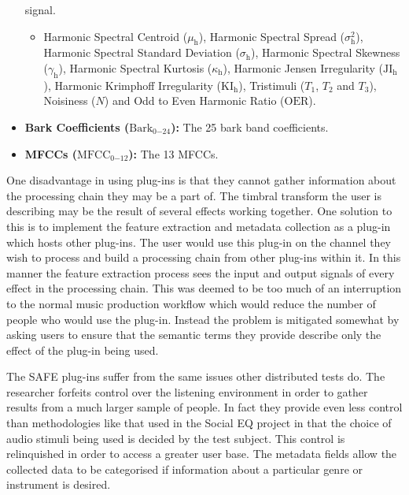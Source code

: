 \begin{itemize}
			      signal.
			\begin{itemize}
				\item Harmonic Spectral Centroid ($\mu_{\mathrm{h}}$), Harmonic Spectral Spread
				      ($\sigma_{\mathrm{h}}^{2}$), Harmonic Spectral Standard Deviation
				      ($\sigma_{\mathrm{h}}$), Harmonic Spectral Skewness ($\gamma_{\mathrm{h}}$), Harmonic
				      Spectral Kurtosis ($\kappa_{\mathrm{h}}$), Harmonic Jensen Irregularity
				      ($\mathrm{JI_{h}}$), Harmonic Krimphoff Irregularity
				      ($\mathrm{KI_{h}}$), Tristimuli ($T_{1}$, $T_{2}$ and $T_{3}$), Noisiness
				      ($N$) and Odd to Even Harmonic Ratio ($\mathrm{OER}$).
			\end{itemize}
			\item {\bf{Bark Coefficients (}}$\mathrm{Bark}_{0\mathrm{-}24}${\bf{):}} The 25 bark band
			      coefficients.
			\item {\bf{MFCCs (}}$\mathrm{MFCC}_{0\mathrm{-}12}${\bf{):}} The 13 MFCCs.
		\end{itemize}

		One disadvantage in using plug-ins is that they cannot gather information about the processing chain they
		may be a part of. The timbral transform the user is describing may be the result of several effects working
		together. One solution to this is to implement the feature extraction and metadata collection as a plug-in
		which hosts other plug-ins. The user would use this plug-in on the channel they wish to process and build a
		processing chain from other plug-ins within it. In this manner the feature extraction process sees the
		input and output signals of every effect in the processing chain. This was deemed to be too much of an
		interruption to the normal music production workflow which would reduce the number of people who would use
		the plug-in. Instead the problem is mitigated somewhat by asking users to ensure that the semantic terms
		they provide describe only the effect of the plug-in being used.

		The SAFE plug-ins suffer from the same issues other distributed tests do. The researcher forfeits control
		over the listening environment in order to gather results from a much larger sample of people. In fact they
		provide even less control than methodologies like that used in the Social EQ project
		\citep{cartwright2013socialeq} in that the choice of audio stimuli being used is decided by the test
		subject. This control is relinquished in order to access a greater user base. The metadata fields allow the
		collected data to be categorised if information about a particular genre or instrument is desired.

